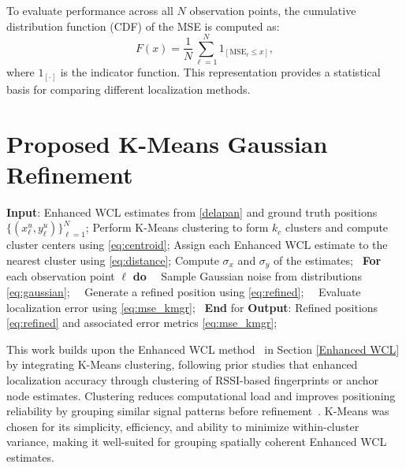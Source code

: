 \documentclass[journal]{IEEEtran}
\begin{document}
To evaluate performance across all $N$ observation points, the cumulative distribution function (CDF) of the MSE is computed as:
\begin{equation}
F(x) = \frac{1}{N} \sum_{\ell=1}^{N} 1_{[\mathrm{MSE}_\ell \leq x]},
\end{equation}
where $1_{[\cdot]}$ is the indicator function.  
This representation provides a statistical basis for comparing different localization methods.


\section{Proposed K-Means Gaussian Refinement}
\label{proposed}



\begin{algorithm}[t]
\begin{algorithmic}[1]
\caption{K-Means Gaussian Refinement (KMGR)}
\label{alg:kmgr}
\State \textbf{Input}: Enhanced WCL estimates from \eqref{delapan} and ground truth positions $\{(x_\ell^u, y_\ell^u)\}_{\ell=1}^N$;
\State Perform K-Means clustering to form $k_c$ clusters and compute cluster centers using \eqref{eq:centroid}; %
\State Assign each Enhanced WCL estimate to the nearest cluster using \eqref{eq:distance}; %
\State Compute $\sigma_x$ and $\sigma_y$ of the estimates; %
\State \, \textbf{For} each observation point $\ell$ \textbf{do}
  \State \, \, Sample Gaussian noise from distributions \eqref{eq:gaussian}; %
  \State \, \, Generate a refined position using \eqref{eq:refined}; %
  \State \, \, Evaluate localization error using \eqref{eq:mse_kmgr}; %
\State \, \textbf{End} for
\State \textbf{Output}: Refined positions \eqref{eq:refined} and associated error metrics \eqref{eq:mse_kmgr};
\end{algorithmic}
\end{algorithm}

This work builds upon the Enhanced WCL method~\cite{hybrid,adaptive} in Section \ref{Enhanced WCL} by integrating K-Means clustering, following prior studies that enhanced localization accuracy through clustering of RSSI-based fingerprints or anchor node estimates. Clustering reduces computational load and improves positioning reliability by grouping similar signal patterns before refinement~\cite{centroid}. K-Means was chosen for its simplicity, efficiency, and ability to minimize within-cluster variance, making it well-suited for grouping spatially coherent Enhanced WCL estimates.
\end{document}
